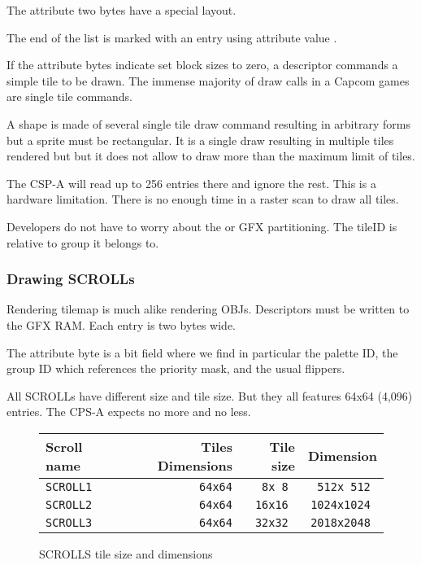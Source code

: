 

The attribute two bytes have a special layout.

 

The end of the list is marked with an entry using attribute value . 

If the attribute bytes indicate set block sizes to zero, a descriptor commands a simple tile to be drawn. The immense majority of draw calls in a Capcom games are single tile commands.

A shape is made of several single tile draw command resulting in arbitrary forms but a sprite must be rectangular. It is a single draw resulting in multiple tiles rendered but but it does not allow to draw more than the maximum limit of tiles.

The CSP-A will read up to 256 entries there and ignore the rest. This is a hardware limitation. There is no enough time in a raster scan to draw all tiles.

Developers do not have to worry about the  or GFX partitioning. The tileID is relative to group it belongs to.

\subsubsection{Drawing SCROLLs}

Rendering tilemap is much alike rendering OBJs. Descriptors must be written to the GFX RAM. Each entry is two bytes wide.

 

The attribute byte is a bit field where we find in particular the palette ID, the group ID which references the priority mask, and the usual flippers.

 

All SCROLLs have different size and tile size. But they all features 64x64 (4,096) entries. The CPS-A expects no more and no less. 


 \begin{figure}[H]
\begin{tabularx}{\textwidth}{Xrrr}
  \toprule    
  \textbf{Scroll name } & \textbf{ Tiles Dimensions } & \textbf{ Tile size }  & \textbf{Dimension }\\  
  \toprule   
    
\texttt{SCROLL1} & \texttt{64x64} & \texttt{8x 8 } &  \texttt{512x 512 }  \\  
\texttt{SCROLL2} & \texttt{64x64} & \texttt{16x16 } &  \texttt{1024x1024 }   \\  
\texttt{SCROLL3} & \texttt{64x64} & \texttt{32x32 } &  \texttt{2018x2048 }   \\  
  \toprule   
\end{tabularx}
\caption*{SCROLLS tile size and dimensions}
\end{figure}

